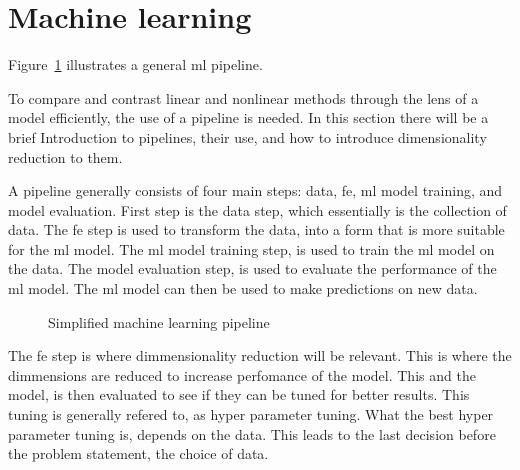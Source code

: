 \section{Machine learning}\label{sec:machine-learning}

Figure~\ref{fig:basic-machine-learning-pipeline} illustrates a general \gls{ml} pipeline.

To compare and contrast linear and nonlinear methods through the lens of a model efficiently, the use of a pipeline is needed. In this section there will be a brief Introduction to pipelines, their use, and how to introduce dimensionality reduction to them.

A pipeline generally consists of four main steps: data, \gls{fe}, \gls{ml} model training, and model evaluation. First step is the data step, which essentially is the collection of data. The \gls{fe} step is used to transform the data, into a form that is more suitable for the \gls{ml} model. The \gls{ml} model training step, is used to train the \gls{ml} model on the data. The model evaluation step, is used to evaluate the performance of the \gls{ml} model. The \gls{ml} model can then be used to make predictions on new data. 

\begin{figure}[htb!]
    \centering
    
    \caption{Simplified machine learning pipeline}
    \label{fig:basic-machine-learning-pipeline}
\end{figure}

The \gls{fe} step is where dimmensionality reduction will be relevant. This is where the dimmensions are reduced to increase perfomance of the model. This and the model, is then evaluated to see if they can be tuned for better results. This tuning is generally refered to, as hyper parameter tuning. What the best hyper parameter tuning is, depends on the data. This leads to the last decision before the problem statement, the choice of data.
